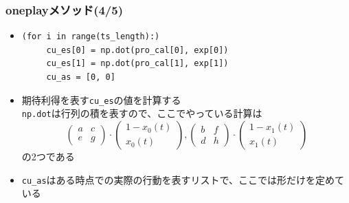 \documentclass[dvipdfmx,fleqn,handout]{beamer}
\begin{document}
\begin{frame}[fragile]%
\frametitle{oneplayメソッド(4/5)}
\begin{itemize}\setlength{\parskip}{0.5em}
\item
\footnotesize
\begin{verbatim}   
(for i in range(ts_length):)
     cu_es[0] = np.dot(pro_cal[0], exp[0])
     cu_es[1] = np.dot(pro_cal[1], exp[1])
     cu_as = [0, 0]
\end{verbatim}\pause
\normalsize
\item
期待利得を表す\verb|cu_es|の値を計算する\pause\\
\verb|np.dot|は行列の積を表すので、ここでやっている計算は
\footnotesize
\begin{equation*}
\begin{pmatrix}
a & c\\
e & g
\end{pmatrix}\cdot
\begin{pmatrix}
1-x_0(t) \\
x_0(t)
\end{pmatrix}
, 
\begin{pmatrix}
b & f\\
d & h
\end{pmatrix}\cdot
\begin{pmatrix}
1-x_1(t)\\
x_1(t)
\end{pmatrix}
\end{equation*}
\normalsize
の2つである\pause
\item
\verb|cu_as|はある時点での実際の行動を表すリストで、ここでは形だけを定めている
\end{itemize}
\end{frame}
\end{document}
